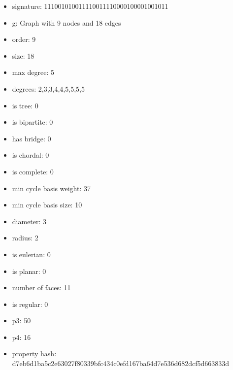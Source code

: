 \newpage
\begin{figure}
\end{figure}
\begin{itemize}
\item signature: 111001010011110011110000100001001011
\item g: Graph with 9 nodes and 18 edges
\item order: 9
\item size: 18
\item max degree: 5
\item degrees: 2,3,3,4,4,5,5,5,5
\item is tree: 0
\item is bipartite: 0
\item has bridge: 0
\item is chordal: 0
\item is complete: 0
\item min cycle basis weight: 37
\item min cycle basis size: 10
\item diameter: 3
\item radius: 2
\item is eulerian: 0
\item is planar: 0
\item number of faces: 11
\item is regular: 0
\item p3: 50
\item p4: 16
\item property hash: d7eb6d1ba5c2e63027f80339bfc434c0efd167ba64d7e536d682dcf5d663833d
\end{itemize}
